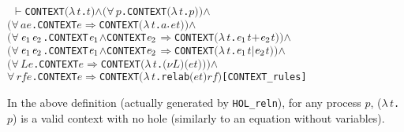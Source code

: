 \documentclass[GCNS]{yincog}
\renewcommand{\HOLinline}[1]{\mbox{\textup{\texttt{#1}}}}
\renewcommand{\HOLConst}[1]{\texttt{#1}}
\renewcommand{\HOLBoundVar}[1]{\ensuremath{\mathit{#1}}}
\renewcommand{\HOLFreeVar}[1]{\ensuremath{\mathit{#1}}}
\renewcommand{\HOLSymConst}[1]{#1}
\renewcommand{\HOLTokenConj}{\ensuremath{\wedge}}
\renewcommand{\HOLTokenForall}{\ensuremath{\forall \,}}
\renewcommand{\HOLTokenLambda}{\ensuremath{\lambda \,}}
\renewcommand{\HOLTokenTurnstile}{\ensuremath{\:\:\vdash}}
\theoremstyle{remark}
\theoremstyle{theorem}
\theoremstyle{remark}
\renewcommand{\HOLTokenImp}{\ensuremath{\Longrightarrow}}
\begin{document}
\begin{alltt}
\HOLTokenTurnstile{} \HOLConst{CONTEXT} \ensuremath{(}\HOLTokenLambda{}\HOLBoundVar{t}. \HOLBoundVar{t}\ensuremath{)} \HOLSymConst{\HOLTokenConj{}} \ensuremath{(}\HOLSymConst{\HOLTokenForall{}}\HOLBoundVar{p}. \HOLConst{CONTEXT} \ensuremath{(}\HOLTokenLambda{}\HOLBoundVar{t}. \HOLBoundVar{p}\ensuremath{)}\ensuremath{)} \HOLSymConst{\HOLTokenConj{}}
   \ensuremath{(}\HOLSymConst{\HOLTokenForall{}}\HOLBoundVar{a} \HOLBoundVar{e}. \HOLConst{CONTEXT} \HOLBoundVar{e} \HOLSymConst{\HOLTokenImp{}} \HOLConst{CONTEXT} \ensuremath{(}\HOLTokenLambda{}\HOLBoundVar{t}. \HOLBoundVar{a}\HOLSymConst{\ensuremath{\ldotp}}\HOLBoundVar{e} \HOLBoundVar{t}\ensuremath{)}\ensuremath{)} \HOLSymConst{\HOLTokenConj{}}
   \ensuremath{(}\HOLSymConst{\HOLTokenForall{}}\ensuremath{\HOLBoundVar{e}\sb{\mathrm{1}}} \ensuremath{\HOLBoundVar{e}\sb{\mathrm{2}}}. \HOLConst{CONTEXT} \ensuremath{\HOLBoundVar{e}\sb{\mathrm{1}}} \HOLSymConst{\HOLTokenConj{}} \HOLConst{CONTEXT} \ensuremath{\HOLBoundVar{e}\sb{\mathrm{2}}} \HOLSymConst{\HOLTokenImp{}} \HOLConst{CONTEXT} \ensuremath{(}\HOLTokenLambda{}\HOLBoundVar{t}. \ensuremath{\HOLBoundVar{e}\sb{\mathrm{1}}} \HOLBoundVar{t} \HOLSymConst{\ensuremath{+}} \ensuremath{\HOLBoundVar{e}\sb{\mathrm{2}}} \HOLBoundVar{t}\ensuremath{)}\ensuremath{)} \HOLSymConst{\HOLTokenConj{}}
   \ensuremath{(}\HOLSymConst{\HOLTokenForall{}}\ensuremath{\HOLBoundVar{e}\sb{\mathrm{1}}} \ensuremath{\HOLBoundVar{e}\sb{\mathrm{2}}}. \HOLConst{CONTEXT} \ensuremath{\HOLBoundVar{e}\sb{\mathrm{1}}} \HOLSymConst{\HOLTokenConj{}} \HOLConst{CONTEXT} \ensuremath{\HOLBoundVar{e}\sb{\mathrm{2}}} \HOLSymConst{\HOLTokenImp{}} \HOLConst{CONTEXT} \ensuremath{(}\HOLTokenLambda{}\HOLBoundVar{t}. \ensuremath{\HOLBoundVar{e}\sb{\mathrm{1}}} \HOLBoundVar{t} \HOLSymConst{\ensuremath{\mid}} \ensuremath{\HOLBoundVar{e}\sb{\mathrm{2}}} \HOLBoundVar{t}\ensuremath{)}\ensuremath{)} \HOLSymConst{\HOLTokenConj{}}
   \ensuremath{(}\HOLSymConst{\HOLTokenForall{}}\HOLBoundVar{L} \HOLBoundVar{e}. \HOLConst{CONTEXT} \HOLBoundVar{e} \HOLSymConst{\HOLTokenImp{}} \HOLConst{CONTEXT} \ensuremath{(}\HOLTokenLambda{}\HOLBoundVar{t}. \ensuremath{(\nu}\HOLBoundVar{L}\ensuremath{)} \ensuremath{(}\HOLBoundVar{e} \HOLBoundVar{t}\ensuremath{)}\ensuremath{)}\ensuremath{)} \HOLSymConst{\HOLTokenConj{}}
   \HOLSymConst{\HOLTokenForall{}}\HOLBoundVar{rf} \HOLBoundVar{e}. \HOLConst{CONTEXT} \HOLBoundVar{e} \HOLSymConst{\HOLTokenImp{}} \HOLConst{CONTEXT} \ensuremath{(}\HOLTokenLambda{}\HOLBoundVar{t}. \HOLConst{relab} \ensuremath{(}\HOLBoundVar{e} \HOLBoundVar{t}\ensuremath{)} \HOLBoundVar{rf}\ensuremath{)}\hfill{[CONTEXT\_rules]}
\end{alltt}
%
In the above definition (actually generated by \texttt{HOL\_reln}), for
any process $p$, (\HOLinline{\HOLTokenLambda{}\HOLBoundVar{t}.\\\;\HOLFreeVar{p}})
is a valid context with no hole (similarly to an equation without variables).
\end{document}
